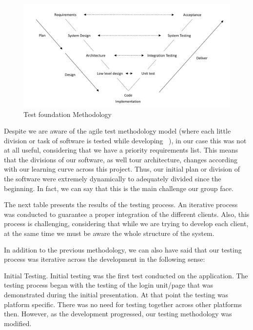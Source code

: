 \begin{figure}[ht]
\centering
\includegraphics[width=1\textwidth]{figs/testing-met}
	\caption{Test foundation Methodology}
	\label{fig:testing}
\end{figure}


Despite we are aware of the agile test methodology model (where each little division or task of software is tested while developing ~\cite{rtyeteey}), in our case this was not at all useful, considering that we have a priority requirements list. This means that the divisions of our software, as well tour architecture, changes according with our learning curve across this project. Thus, our initial plan or division of the software were extremely dynamically to adequately divided since the beginning. In fact, we can say that this is the main challenge our group face.

The next table presents the results of the testing process. An iterative process was conducted to guarantee a proper integration of the different clients.  Also, this process is challenging, considering that while we are trying to develop each client, at the same time we must be aware the whole structure of the system.  


In addition to the previous methodology, we can also have said that our testing process was iterative across the development in the following sense: 

Initial Testing.	Initial testing was the first test conducted on the application. The testing process began with the testing of the login unit/page that was demonstrated    during the initial presentation. At that point the testing was platform specific. There was no need for testing together across other platforms then. However, as the development progressed, our testing methodology was modified. 

